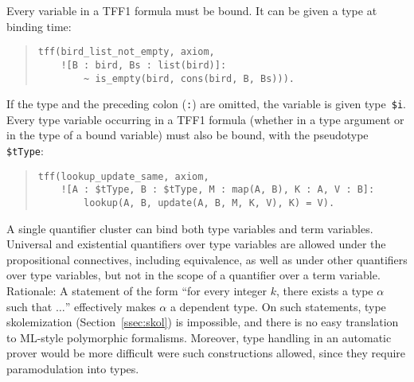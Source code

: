 Every variable in a TFF1 formula must be bound. It can be given a type at
binding time:
\begin{quote}
\begin{verbatim}
tff(bird_list_not_empty, axiom,
    ![B : bird, Bs : list(bird)]:
        ~ is_empty(bird, cons(bird, B, Bs))).
\end{verbatim}
\end{quote}
If the type and the preceding colon ({\tt :}) are omitted, the variable is given
type~{\tt\$i}. Every type variable occurring in a TFF1 formula
(whether in a type argument or in the type of a bound variable)
must also be bound, with the pseudotype {\tt\$tType}:
\begin{quote}
\begin{verbatim}
tff(lookup_update_same, axiom,
    ![A : $tType, B : $tType, M : map(A, B), K : A, V : B]:
        lookup(A, B, update(A, B, M, K, V), K) = V).
\end{verbatim}
\end{quote}
A single quantifier cluster can bind both type variables and term variables.
%
Universal and existential quantifiers over type variables are allowed under the
propositional connectives, including equivalence, as well as under other
quantifiers over type variables, but not in the scope of a quantifier over a
term variable.
Rationale: A statement of the form ``for every integer $k$, there exists a type
$\alpha$ such that $\ldots$'' effectively makes $\alpha$ a dependent type.
On such statements, type skolemization (Section~\ref{ssec:skol}) is impossible,
and there is no easy translation to ML-style polymorphic formalisms.
Moreover, type handling in an automatic prover would be more difficult were
such constructions allowed, since they require paramodulation into types.

